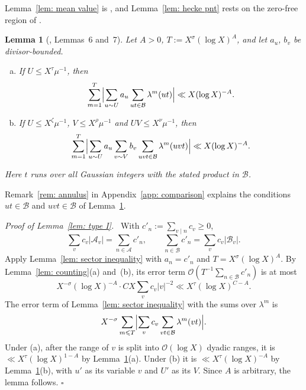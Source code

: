 \documentclass{article}
\numberwithin{equation}{section}
\newtheorem{lemma}{Lemma}
\newenvironment{proof}[1][Proof]{\par\medskip\noindent\textit{#1.}\ }{\hfill$\square$\par\medskip}
\newcommand{\Le}{\leqslant}
\newcommand{\Ge}{\geqslant}
\begin{document}
Lemma~\ref{lem: mean value} is \citet[Lemma~6]{coleman1993rosser}, and Lemma~\ref{lem: hecke pnt} rests on the zero-free region of \citet{coleman1990zero}.

\begin{lemma}[\citet{harman2001gaussian}, Lemmas~6 and~7]
\label{lem: type I input}
Let $A > 0$, $T := X^{\sigma} (\log X)^A$, and let $a_u$, $b_v$ be divisor-bounded.
\begin{enumerate}[(a)]
\item If $U \Le X^{\tau} \mu^{-1}$, then
\begin{equation*}
\sum_{m = 1}^{T} \Bigl| \sum_{u \sim U} a_u \sum_{ut \in \mathcal{B}} \lambda^m(ut) \Bigr| \ll X (\log X)^{-A}.
\end{equation*}
\item If $U \Le X^{\zeta} \mu^{-1}$, $V \Le X^{\rho} \mu^{-1}$ and $UV \Le X^{\nu} \mu^{-1}$, then
\begin{equation*}
\sum_{m = 1}^{T} \Bigl| \sum_{u \sim U} a_u \sum_{v \sim V} b_v \sum_{uvt \in \mathcal{B}} \lambda^m(uvt) \Bigr| \ll X (\log X)^{-A}.
\end{equation*}
\end{enumerate}
Here $t$ runs over all Gaussian integers with the stated product in $\mathcal{B}$.
\end{lemma}

Remark~\ref{rem: annulus} in Appendix~\ref{app: comparison} explains the conditions $ut \in \mathcal{B}$ and $uvt \in \mathcal{B}$ of Lemma~\ref{lem: type I input}.

\begin{proof}[Proof of Lemma~\ref{lem: type I}]
With $c'_n := \sum_{v \mid n} c_v \Ge 0$,
\begin{equation*}
\sum_v c_v |\mathcal{A}_v| = \sum_{n \in \mathcal{A}} c'_n, \qquad \sum_{n \in \mathcal{B}} c'_n = \sum_v c_v |\mathcal{B}_v|.
\end{equation*}
Apply Lemma~\ref{lem: sector inequality} with $a_n = c'_n$ and $T = X^{\sigma} (\log X)^A$. By Lemma~\ref{lem: counting}(a) and~(b), its error term $\mathcal{O}(T^{-1} \sum_{n \in \mathcal{B}} c'_n)$ is at most
\begin{equation*}
X^{-\sigma} (\log X)^{-A} \cdot C X \sum_v c_v |v|^{-2} \ll X^{\tau} (\log X)^{C - A}.
\end{equation*}
The error term of Lemma~\ref{lem: sector inequality} with the sums over $\lambda^m$ is
\begin{equation*}
X^{-\sigma} \sum_{m \Le T} \Bigl| \sum_v c_v \sum_{vt \in \mathcal{B}} \lambda^m(vt) \Bigr|.
\end{equation*}
Under (a), after the range of $v$ is split into $\mathcal{O}(\log X)$ dyadic ranges, it is $\ll X^{\tau} (\log X)^{1 - A}$ by Lemma~\ref{lem: type I input}(a). Under (b) it is $\ll X^{\tau} (\log X)^{-A}$ by Lemma~\ref{lem: type I input}(b), with $u'$ as its variable $v$ and $U'$ as its $V$. Since $A$ is arbitrary, the lemma follows.
\end{proof}
\end{document}
